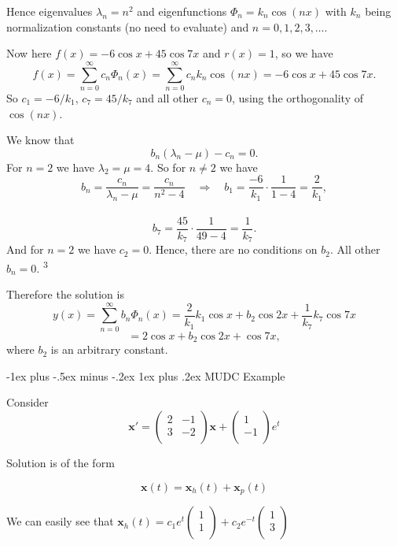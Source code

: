 \documentclass[10pt,landscape]{article}
\makeatletter
\newcommand{\mbf}{\mathbf}
\renewcommand{\subsubsection}{\@startsection{subsubsection}{3}{0mm}%
                                {-1ex plus -.5ex minus -.2ex}%
                                {1ex plus .2ex}%
                                {\normalfont\small\bfseries}}
\makeatother
\begin{document}
\begin{multicols}{2}
Hence eigenvalues \( \lambda_n = n^2 \) and eigenfunctions \( \Phi_n = k_n \cos(nx) \) with \( k_n \) being normalization constants (no need to evaluate) and \( n = 0, 1, 2, 3, \dots \). 

Now here \( f(x) = -6 \cos x + 45 \cos 7x \) and \( r(x) = 1 \), so we have\\
\[
f(x) = \sum_{n=0}^{\infty} c_n \Phi_n(x) = \sum_{n=0}^{\infty} c_n k_n \cos(nx) = -6 \cos x + 45 \cos 7x.
\]
So \( c_1 = -6/k_1 \), \( c_7 = 45/k_7 \) and all other \( c_n = 0 \), using the orthogonality of \( \cos(nx) \). 

We know that\\
\[
b_n (\lambda_n - \mu) - c_n = 0.
\]
For \( n = 2 \) we have \( \lambda_2 = \mu = 4 \). So for \( n \neq 2 \) we have\\
\[
b_n = \frac{c_n}{\lambda_n - \mu} = \frac{c_n}{n^2 - 4} \quad \Rightarrow \quad b_1 = \frac{-6}{k_1} \cdot \frac{1}{1 - 4} = \frac{2}{k_1},\]\\\[ b_7 = \frac{45}{k_7} \cdot \frac{1}{49 - 4} = \frac{1}{k_7}.
\]
And for \( n = 2 \) we have \( c_2 = 0 \). Hence, there are no conditions on \( b_2 \). All other \( b_n = 0 \). \textsuperscript{3}

Therefore the solution is\\
\[
y(x) = \sum_{n=0}^{\infty} b_n \Phi_n(x) = \frac{2}{k_1} k_1 \cos x + b_2 \cos 2x + \frac{1}{k_7} k_7 \cos 7x\]\[ = 2 \cos x + b_2 \cos 2x + \cos 7x,
\]
where \( b_2 \) is an arbitrary constant.

\subsubsection{MUDC Example}

Consider $$\mbf{x}' = \begin{pmatrix}
    2 & -1\\
    3 & -2\\
\end{pmatrix}\mbf{x} + \begin{pmatrix}
    1\\
    -1\\
\end{pmatrix}e^t$$

Solution is of the form 

$$\mbf{x}(t) = \mbf{x}_h(t) + \mbf{x}_p(t)$$

We can easily see that $\mbf{x}_h(t) = c_1e^t\begin{pmatrix}
    1\\
    1\\
\end{pmatrix} + c_2 e^{-t}\begin{pmatrix}
    1\\
    3\\
\end{pmatrix}$


\end{multicols}
\end{document}
